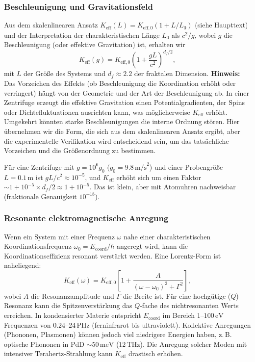 \documentclass[12pt]{article}
\theoremstyle{remark}
\newcommand{\Keff}{K_{\mathrm{eff}}}
\newcommand{\Keffzero}{K_{\mathrm{eff},0}}
\newcommand{\df}{d_{\!f}}
\begin{document}
	\subsubsection{Beschleunigung und Gravitationsfeld}
	
	Aus dem skalenlinearen Ansatz \(\Keff(L) = \Keffzero (1 + L/L_0)\) (siehe Haupttext) und der Interpretation der charakteristischen Länge \(L_0\) als \(c^2/g\), wobei \(g\) die Beschleunigung (oder effektive Gravitation) ist, erhalten wir
	\begin{equation}
		\Keff(g) = \Keffzero \left(1 + \frac{gL}{c^2}\right)^{\df/2},
		\label{eq:keff-g}
	\end{equation}
	mit \(L\) der Größe des Systems und \(\df \approx 2.2\) der fraktalen Dimension. \textbf{Hinweis:} Das Vorzeichen des Effekts (ob Beschleunigung die Koordination erhöht oder verringert) hängt von der Geometrie und der Art der Beschleunigung ab. In einer Zentrifuge erzeugt die effektive Gravitation einen Potentialgradienten, der Spins oder Dichtefluktuationen ausrichten kann, was möglicherweise \(\Keff\) erhöht. Umgekehrt könnten starke Beschleunigungen die interne Ordnung stören. Hier übernehmen wir die Form, die sich aus dem skalenlinearen Ansatz ergibt, aber die experimentelle Verifikation wird entscheidend sein, um das tatsächliche Vorzeichen und die Größenordnung zu bestimmen.
	
	Für eine Zentrifuge mit \(g = 10^6g_0\) (\(g_0 = 9.8\,\text{m/s}^2\)) und einer Probengröße \(L = 0.1\,\text{m}\) ist \(gL/c^2 \approx 10^{-5}\), und \(\Keff\) erhöht sich um einen Faktor \(\sim 1 + 10^{-5}\times\df/2 \approx 1 + 10^{-5}\). Das ist klein, aber mit Atomuhren nachweisbar (fraktionale Genauigkeit \(10^{-18}\)).
	
	\subsubsection{Resonante elektromagnetische Anregung}
	
	Wenn ein System mit einer Frequenz \(\omega\) nahe einer charakteristischen Koordinationsfrequenz \(\omega_0 = E_{\mathrm{coord}}/\hbar\) angeregt wird, kann die Koordinationseffizienz resonant verstärkt werden. Eine Lorentz-Form ist naheliegend:
	\begin{equation}
		\Keff(\omega) = \Keffzero \left[ 1 + \frac{A}{(\omega - \omega_0)^2 + \Gamma^2} \right],
		\label{eq:keff-omega}
	\end{equation}
	wobei \(A\) die Resonanzamplitude und \(\Gamma\) die Breite ist. Für eine hochgütige (\(Q\)) Resonanz kann die Spitzenverstärkung das \(Q\)-fache des nichtresonanten Werts erreichen. In kondensierter Materie entspricht \(E_{\mathrm{coord}}\) im Bereich \(1\)–\(100\,\text{eV}\) Frequenzen von \(0.24\)–\(24\,\text{PHz}\) (ferninfrarot bis ultraviolett). Kollektive Anregungen (Phononen, Plasmonen) können jedoch viel niedrigere Energien haben, z. B. optische Phononen in PdD \(\sim 50\,\text{meV}\) (\(12\,\text{THz}\)). Die Anregung solcher Moden mit intensiver Terahertz-Strahlung kann \(\Keff\) drastisch erhöhen.
	
\end{document}

